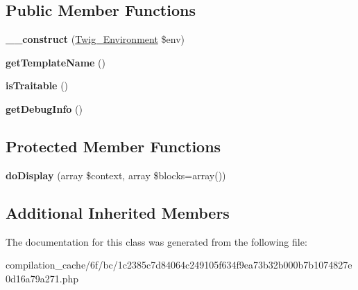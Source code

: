 \subsection*{Public Member Functions}
\begin{DoxyCompactItemize}
\item 
\hypertarget{class_____twig_template__6fbc1c2385c7d84064c249105f634f9ea73b32b000b7b1074827e0d16a79a271_a4f8326243132c1450a81e0a817aa1be7}{}{\bfseries \+\_\+\+\_\+construct} (\hyperlink{class_twig___environment}{Twig\+\_\+\+Environment} \$env)\label{class_____twig_template__6fbc1c2385c7d84064c249105f634f9ea73b32b000b7b1074827e0d16a79a271_a4f8326243132c1450a81e0a817aa1be7}

\item 
\hypertarget{class_____twig_template__6fbc1c2385c7d84064c249105f634f9ea73b32b000b7b1074827e0d16a79a271_a621a3ccd148ed8b9e937da6959c98f39}{}{\bfseries get\+Template\+Name} ()\label{class_____twig_template__6fbc1c2385c7d84064c249105f634f9ea73b32b000b7b1074827e0d16a79a271_a621a3ccd148ed8b9e937da6959c98f39}

\item 
\hypertarget{class_____twig_template__6fbc1c2385c7d84064c249105f634f9ea73b32b000b7b1074827e0d16a79a271_aa9eb89be270f6afc256ef5e272b78a63}{}{\bfseries is\+Traitable} ()\label{class_____twig_template__6fbc1c2385c7d84064c249105f634f9ea73b32b000b7b1074827e0d16a79a271_aa9eb89be270f6afc256ef5e272b78a63}

\item 
\hypertarget{class_____twig_template__6fbc1c2385c7d84064c249105f634f9ea73b32b000b7b1074827e0d16a79a271_abd0ecb0136f4228db2bd963bfc1e20d7}{}{\bfseries get\+Debug\+Info} ()\label{class_____twig_template__6fbc1c2385c7d84064c249105f634f9ea73b32b000b7b1074827e0d16a79a271_abd0ecb0136f4228db2bd963bfc1e20d7}

\end{DoxyCompactItemize}
\subsection*{Protected Member Functions}
\begin{DoxyCompactItemize}
\item 
\hypertarget{class_____twig_template__6fbc1c2385c7d84064c249105f634f9ea73b32b000b7b1074827e0d16a79a271_adb62b7c226e07d30f836ed16158d924f}{}{\bfseries do\+Display} (array \$context, array \$blocks=array())\label{class_____twig_template__6fbc1c2385c7d84064c249105f634f9ea73b32b000b7b1074827e0d16a79a271_adb62b7c226e07d30f836ed16158d924f}

\end{DoxyCompactItemize}
\subsection*{Additional Inherited Members}


The documentation for this class was generated from the following file\+:\begin{DoxyCompactItemize}
\item 
compilation\+\_\+cache/6f/bc/1c2385c7d84064c249105f634f9ea73b32b000b7b1074827e0d16a79a271.\+php\end{DoxyCompactItemize}
